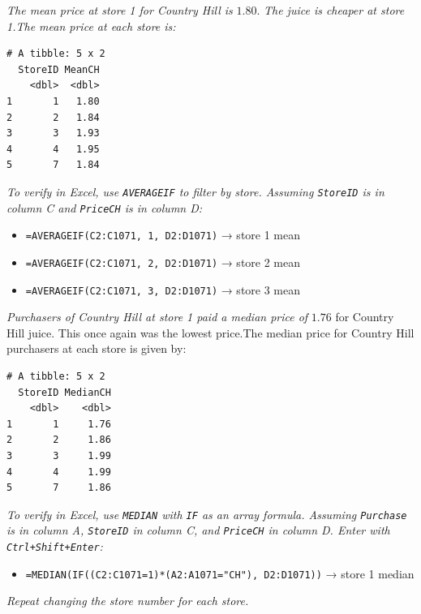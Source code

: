 \documentclass[
  11pt,
  letterpaper,
  DIV=11,
  numbers=noendperiod,
  oneside,
  open=any]{scrreprt}
\providecommand{\tightlist}{%
  \setlength{\itemsep}{0pt}\setlength{\parskip}{0pt}}\usepackage{longtable,booktabs,array}
\newenvironment{bsanswerkey}[2]{%
  \begin{tcolorbox}[bsbase, colback=bspaper2, colframe=bsline, fontupper=\small,
    title={\hypertarget{a-#1}{}\label{a-#1}\hyperlink{q-#1}{\textcolor{bsink2}{\MakeUppercase{#2}}}\hfill
      \hyperlink{q-#1}{\textcolor{bsaccent}{\normalfont\footnotesize back to page \pageref{q-#1}}}}]}%
  {\end{tcolorbox}}
\begin{document}
\begin{bsanswerkey}{bsans22}{Exercise 2, question 2}

\emph{The mean price at store 1 for Country Hill is} \(1.80\). \emph{The
juice is cheaper at store 1.The mean price at each store is:}

\begin{verbatim}
# A tibble: 5 x 2
  StoreID MeanCH
    <dbl>  <dbl>
1       1   1.80
2       2   1.84
3       3   1.93
4       4   1.95
5       7   1.84
\end{verbatim}

\emph{To verify in Excel, use \texttt{AVERAGEIF} to filter by store.
Assuming \texttt{StoreID} is in column C and \texttt{PriceCH} is in
column D:}

\begin{itemize}
\tightlist
\item
  \texttt{=AVERAGEIF(C2:C1071,\ 1,\ D2:D1071)} → store 1 mean
\item
  \texttt{=AVERAGEIF(C2:C1071,\ 2,\ D2:D1071)} → store 2 mean
\item
  \texttt{=AVERAGEIF(C2:C1071,\ 3,\ D2:D1071)} → store 3 mean
\end{itemize}

\end{bsanswerkey}

\begin{bsanswerkey}{bsans23}{Exercise 2, question 3}

\emph{Purchasers of Country Hill at store 1 paid a median price of}
\(1.76\) for Country Hill juice. This once again was the lowest
price.The median price for Country Hill purchasers at each store is
given by:

\begin{verbatim}
# A tibble: 5 x 2
  StoreID MedianCH
    <dbl>    <dbl>
1       1     1.76
2       2     1.86
3       3     1.99
4       4     1.99
5       7     1.86
\end{verbatim}

\emph{To verify in Excel, use \texttt{MEDIAN} with \texttt{IF} as an
array formula. Assuming \texttt{Purchase} is in column A,
\texttt{StoreID} in column C, and \texttt{PriceCH} in column D. Enter
with \texttt{Ctrl+Shift+Enter}:}

\begin{itemize}
\tightlist
\item
  \texttt{=MEDIAN(IF((C2:C1071=1)*(A2:A1071="CH"),\ D2:D1071))} → store
  1 median
\end{itemize}

\emph{Repeat changing the store number for each store.}

\end{bsanswerkey}
\end{document}
